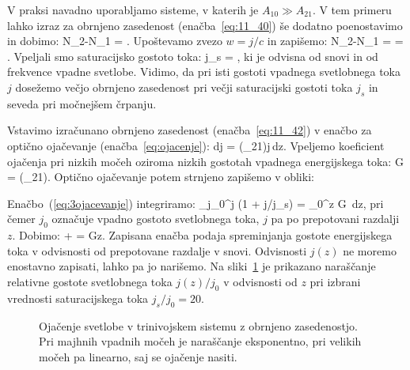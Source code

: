 V praksi navadno uporabljamo sisteme, v katerih je $A_{10}\gg A_{21}$.
V tem primeru lahko izraz za obrnjeno zasedenost (enačba~\ref{eq:11_40}) 
še dodatno poenostavimo in dobimo:
\beq
N_2-N_1 = \cdot{}.
\label{eq:11_41}
\eeq
Upoštevamo zvezo $w = j/c$ in zapišemo:
\beq
N_2-N_1 = \cdot{} = 
\cdot {}.
\label{eq:11_42}
\eeq
Vpeljali smo saturacijsko gostoto toka:
\beq
j_s = ,
\label{eq:11_42a}
\eeq
ki je odvisna od snovi in od frekvence vpadne svetlobe. Vidimo, da pri isti gostoti
vpadnega svetlobnega toka $j$ dosežemo večjo obrnjeno zasedenost pri 
večji saturacijski gostoti toka $j_s$ in seveda pri močnejšem črpanju.

Vstavimo izračunano obrnjeno zasedenost (enačba~\ref{eq:11_42}) v enačbo za 
optično ojačevanje (enačba~\ref{eq:ojacenje}):
\beq
dj = \sigma (\omega_{21})\cdot {}j\,dz.
\label{eq:11_43}
\eeq
Vpeljemo koeficient ojačenja pri nizkih močeh oziroma nizkih gostotah vpadnega 
energijskega toka:
\beq
G = \sigma(\omega_{21}).
\label{eq:11_44}
\eeq
Optično ojačevanje potem strnjeno zapišemo v obliki:

Enačbo~(\ref{eq:3ojacevanje}) integriramo:
\beq
\int_{j_0}^j \left(1 + j/j_s\right) = \int_0^z G\, dz,
\label{eq:11_45}
\eeq
pri čemer $j_0$ označuje vpadno gostoto svetlobnega toka, $j$ pa po 
prepotovani razdalji $z$. Dobimo:
\beq
\ln{} +  = Gz.
\label{eq:11_46}
\eeq
Zapisana enačba podaja spreminjanja gostote
energijskega toka v odvisnosti od prepotovane razdalje v snovi. Odvisnosti
$j(z)$ ne moremo enostavno zapisati, lahko pa jo narišemo.
Na sliki~\ref{fig:11_ojacenje} je prikazano naraščanje
relativne gostote svetlobnega toka $j(z)/j_0$ v odvisnosti od $z$ pri 
izbrani vrednosti saturacijskega toka $j_s/j_0 = 20$.
\begin{figure}[h!]
\centering
\def\svgwidth{70truemm} 

\caption{Ojačenje svetlobe v trinivojskem sistemu z obrnjeno zasedenostjo.
Pri majhnih vpadnih močeh je naraščanje eksponentno, pri velikih močeh 
pa linearno, saj se ojačenje nasiti.
}
\label{fig:11_ojacenje}
\end{figure}

